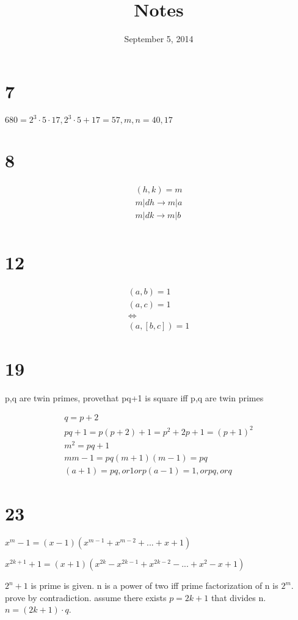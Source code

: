 \documentclass[letterpaper]{article}
\begin{document}
\title{Notes}
\date{September 5, 2014}
\maketitle
\section*{7}
$680=2^3\cdot5\cdot17, 2^3\cdot5+17=57, m,n=40,17$
\section*{8}
\begin{align*}
  (h,k)=m\\
  m|dh\rightarrow m|a\\
  m|dk\rightarrow m|b\\
\end{align*}
\section*{12}
\begin{align*}
  (a,b)=1\\
  (a,c)=1\\
  \Leftrightarrow\\
  (a,[b,c])=1
\end{align*}
\section*{19}
p,q are twin primes, provethat pq+1 is square iff p,q are twin primes

\begin{align*}
  q=p+2\\
  pq+1=p(p+2)+1=p^2+2p+1=(p+1)^2\\
  m^2=pq+1\\
  mm-1=pq
  (m+1)(m-1)=pq\\
  (a+1)=pq, or 1 or p
  (a-1)=1, or pq, or q
\end{align*}
\section*{23}
$x^m-1=(x-1)(x^{m-1}+x^{m-2}+...+x+1)$

$x^{2k+1}+1=(x+1)(x^{2k}-x^{2k-1}+x^{2k-2}-...+x^2-x+1)$

$2^n+1$ is prime is given. n is a power of two iff prime factorization of n is $2^m$. prove by contradiction. assume there exists $p=2k+1$ that divides n. $n=(2k+1)\cdot q$.
  
\end{document}
